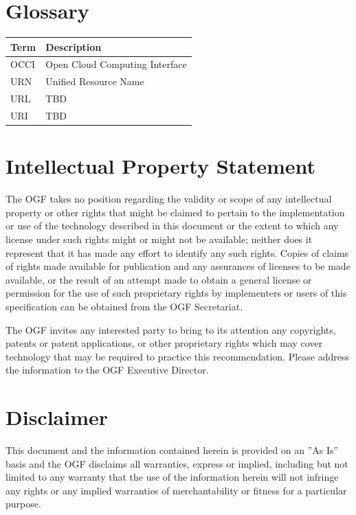 \documentclass[10pt,a4paper]{article}
\begin{document}
\section{Glossary}

\begin{tabular}{l|l}
Term & Description \\
\hline
OCCI & Open Cloud Computing Interface \\
URN & Unified Resource Name \\
URL & TBD \\
URI & TBD \\
\end{tabular}

\section{Intellectual Property Statement}

The OGF takes no position regarding the validity or scope of any intellectual property or other rights that might be claimed to pertain to the implementation or use of the technology described in this document or the extent to which any license under such rights might or might not be available; neither does it represent that it has made any effort to identify any such rights. Copies of claims of rights made available for publication and any assurances of licenses to be made available, or the result of an attempt made to obtain a general license or permission for the use of such proprietary rights by implementers or users of this specification can be obtained from the OGF Secretariat.

The OGF invites any interested party to bring to its attention any copyrights, patents or patent applications, or other proprietary rights which may cover technology that may be required to practice this recommendation. Please address the information to the OGF Executive Director.

\section{Disclaimer}

This document and the information contained herein is provided on an ''As Is'' basis and the OGF disclaims all warranties, express or implied, including but not limited to any warranty that the use of the information herein will not infringe any rights or any implied warranties of merchantability or fitness for a particular purpose.
\end{document}
